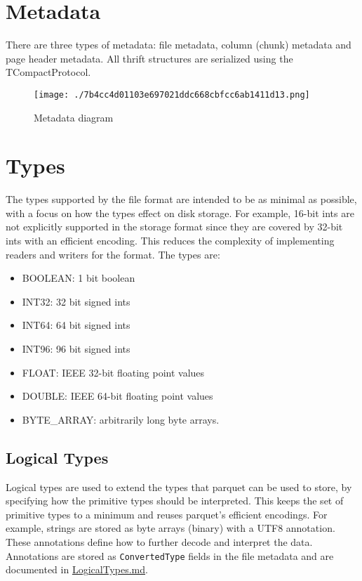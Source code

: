 \documentclass[a4paper,12pt,notitlepage,twoside,openright]{article}
\begin{document}
\hypertarget{metadata}{%
\section{Metadata}\label{metadata}}

There are three types of metadata: file metadata, column (chunk)
metadata and page header metadata. All thrift structures are serialized
using the TCompactProtocol.

\begin{figure}
\centering
\texttt{[image: ./7b4cc4d01103e697021ddc668cbfcc6ab1411d13.png]}
\caption{Metadata diagram}
\end{figure}

\hypertarget{types}{%
\section{Types}\label{types}}

The types supported by the file format are intended to be as minimal as
possible, with a focus on how the types effect on disk storage. For
example, 16-bit ints are not explicitly supported in the storage format
since they are covered by 32-bit ints with an efficient encoding. This
reduces the complexity of implementing readers and writers for the
format. The types are:

\begin{itemize}

\item
  BOOLEAN: 1 bit boolean
\item
  INT32: 32 bit signed ints
\item
  INT64: 64 bit signed ints
\item
  INT96: 96 bit signed ints
\item
  FLOAT: IEEE 32-bit floating point values
\item
  DOUBLE: IEEE 64-bit floating point values
\item
  BYTE\_ARRAY: arbitrarily long byte arrays.
\end{itemize}

\hypertarget{logical-types}{%
\subsection{Logical Types}\label{logical-types}}

Logical types are used to extend the types that parquet can be used to
store, by specifying how the primitive types should be interpreted. This
keeps the set of primitive types to a minimum and reuses parquet's
efficient encodings. For example, strings are stored as byte arrays
(binary) with a UTF8 annotation. These annotations define how to further
decode and interpret the data. Annotations are stored as
\texttt{ConvertedType} fields in the file metadata and are documented in
\url{LogicalTypes.md}.
\end{document}
